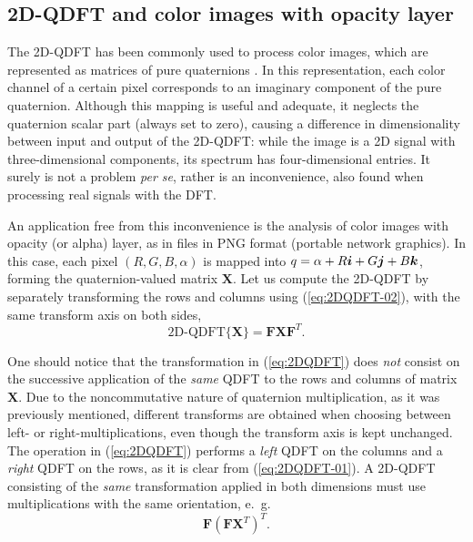 \subsection{2D-QDFT and color images with opacity layer}
\label{subsec:2D_QDFT}
The 2D-QDFT has been commonly used to process color images, which are represented as matrices of pure quaternions \cite{lu20072d,ell2006hypercomplex,chen2018multiple}. In this representation, each color channel of a certain pixel corresponds to an imaginary component of the pure quaternion. Although this mapping is useful and adequate, it neglects the quaternion scalar part (always set to zero), causing a difference in dimensionality between input and output of the 2D-QDFT: while the image is a 2D signal with three-dimensional components, its spectrum has four-dimensional entries. It surely is not a problem \textit{per se}, rather is an inconvenience, also found when processing real signals with the DFT.

An application free from this inconvenience is the analysis of color images with opacity (or alpha) layer, as in files in PNG format (portable network graphics). In this case, each pixel $ (R,G,B,\alpha) $ is mapped into $ q = \alpha + R \boldsymbol{i} + G \boldsymbol{j} + B \boldsymbol{k} $, forming the quaternion-valued matrix $ \mathbf{X} $. Let us compute the 2D-QDFT by separately transforming the rows and columns using (\ref{eq:2DQDFT-02}), with the same transform axis on both sides,
\begin{equation}
\label{eq:2DQDFT}
\text{2D-QDFT}\{\mathbf{X} \} = \mathbf{F} \mathbf{X} \mathbf{F}^T.
\end{equation}

One should notice that the transformation in (\ref{eq:2DQDFT}) does \textit{not} consist on the successive application of the \textit{same} QDFT to the rows and columns of matrix $ \mathbf{X} $. Due to the noncommutative nature of quaternion multiplication, as it was previously mentioned, different transforms are obtained when choosing between left- or right-multiplications, even though the transform axis is kept unchanged. The operation in (\ref{eq:2DQDFT}) performs a \textit{left} QDFT on the columns and a \textit{right} QDFT on the rows, as it is clear from (\ref{eq:2DQDFT-01}). A 2D-QDFT consisting of the \textit{same} transformation applied in both dimensions must use multiplications with the same orientation, e.~g.
\begin{equation}
\label{eq:2DQDFTv2}
\mathbf{F} \left( \mathbf{F}\mathbf{X}^T \right)^T.
\end{equation}

